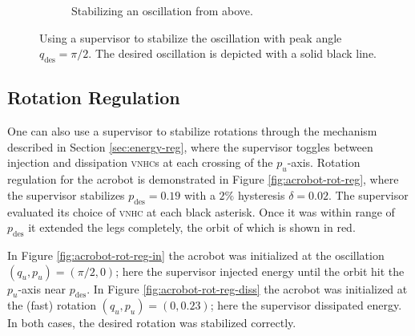 \documentclass[journal,twoside,web, twocolumn]{ieeecolor}
\newcommand*{\vnhc}{\textsc{vnhc}\xspace}
\newcommand*{\vnhcs}{\textsc{vnhc}s\xspace}
\begin{document}
\begin{figure}
\begin{subfigure}[t]{0.49\linewidth}
        \caption{Stabilizing an oscillation from above.}
        \label{fig:acrobot-osc-reg-diss}
    \end{subfigure}
    \caption{Using a supervisor to stabilize the oscillation with peak angle
    \(q_\text{des} = \pi/2\). The desired oscillation is depicted with a solid
    black line.}
    \label{fig:acrobot-osc-reg}
\end{figure}

\subsection{Rotation Regulation}
One can also use a supervisor to stabilize rotations through the mechanism
described in Section \ref{sec:energy-reg}, where the supervisor toggles between
injection and dissipation \vnhcs at each crossing of the \(p_u\)-axis.
Rotation regulation for the acrobot is demonstrated in 
Figure \ref{fig:acrobot-rot-reg}, where the supervisor stabilizes 
\(p_\text{des} = 0.19\) with a \(2\%\) hysteresis \(\delta = 0.02\).
The supervisor evaluated its choice of \vnhc at each black asterisk.
Once it was within range of \(p_\text{des}\) it extended the legs completely,
the orbit of which is shown in red.

In Figure \ref{fig:acrobot-rot-reg-in} the acrobot was initialized at 
the oscillation \((q_u,p_u) = (\pi/2,0)\); here the supervisor injected energy
until the orbit hit the \(p_u\)-axis near \(p_\text{des}\).
In Figure \ref{fig:acrobot-rot-reg-diss} the acrobot was initialized at the
(fast) rotation \((q_u,p_u) = (0, 0.23)\); here the supervisor dissipated energy.
In both cases, the desired rotation was stabilized correctly.
\end{document}
